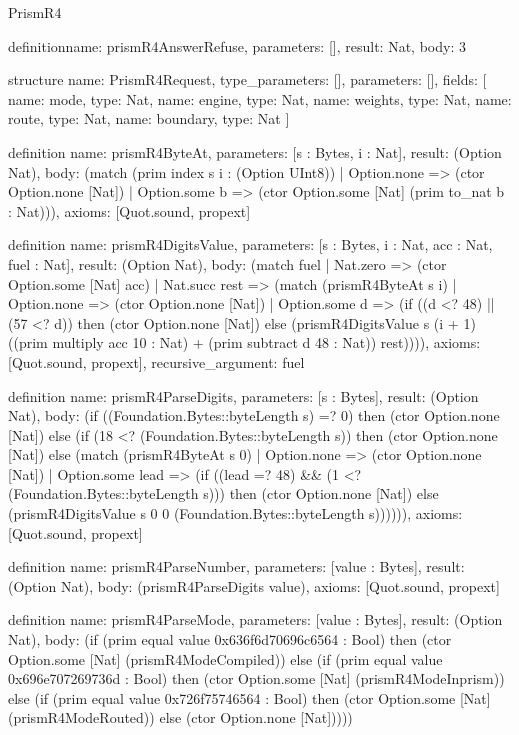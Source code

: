 \begin{lexlean}{PrismR4}
\begin{semanticmodule}
definition{name: prismR4AnswerRefuse, parameters: [], result: Nat, body: 3}

structure{
  name: PrismR4Request,
  type_parameters: [],
  parameters: [],
  fields: [
    {name: mode, type: Nat},
    {name: engine, type: Nat},
    {name: weights, type: Nat},
    {name: route, type: Nat},
    {name: boundary, type: Nat}
  ]
}

definition{
  name: prismR4ByteAt,
  parameters: [s : Bytes, i : Nat],
  result: (Option Nat),
  body: (match (prim index s i : (Option UInt8))
    | Option.none => (ctor Option.none [Nat])
    | Option.some b => (ctor Option.some [Nat] (prim to_nat b : Nat))),
  axioms: [Quot.sound, propext]
}

definition{
  name: prismR4DigitsValue,
  parameters: [s : Bytes, i : Nat, acc : Nat, fuel : Nat],
  result: (Option Nat),
  body: (match fuel
    | Nat.zero => (ctor Option.some [Nat] acc)
    | Nat.succ rest => (match (prismR4ByteAt s i)
      | Option.none => (ctor Option.none [Nat])
      | Option.some d => (if ((d <? 48) || (57 <? d)) then (ctor Option.none [Nat]) else (prismR4DigitsValue s (i + 1) ((prim multiply acc 10 : Nat) + (prim subtract d 48 : Nat)) rest)))),
  axioms: [Quot.sound, propext],
  recursive_argument: fuel
}

definition{
  name: prismR4ParseDigits,
  parameters: [s : Bytes],
  result: (Option Nat),
  body: (if ((Foundation.Bytes::byteLength s) =? 0) then (ctor Option.none [Nat]) else (if (18 <? (Foundation.Bytes::byteLength s)) then (ctor Option.none [Nat]) else (match (prismR4ByteAt s 0)
    | Option.none => (ctor Option.none [Nat])
    | Option.some lead => (if ((lead =? 48) && (1 <? (Foundation.Bytes::byteLength s))) then (ctor Option.none [Nat]) else (prismR4DigitsValue s 0 0 (Foundation.Bytes::byteLength s)))))),
  axioms: [Quot.sound, propext]
}

definition{
  name: prismR4ParseNumber,
  parameters: [value : Bytes],
  result: (Option Nat),
  body: (prismR4ParseDigits value),
  axioms: [Quot.sound, propext]
}

definition{
  name: prismR4ParseMode,
  parameters: [value : Bytes],
  result: (Option Nat),
  body: (if (prim equal value 0x636f6d70696c6564 : Bool) then (ctor Option.some [Nat] (prismR4ModeCompiled)) else (if (prim equal value 0x696e707269736d : Bool) then (ctor Option.some [Nat] (prismR4ModeInprism)) else (if (prim equal value 0x726f75746564 : Bool) then (ctor Option.some [Nat] (prismR4ModeRouted)) else (ctor Option.none [Nat]))))
}


\end{semanticmodule}
\end{lexlean}
